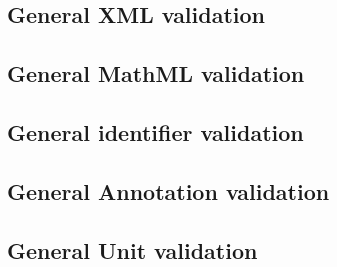 \subsection*{General XML validation} \begin{sbmlenum}


\end{sbmlenum} \subsection*{General MathML validation} \begin{sbmlenum}



\end{sbmlenum} \subsection*{General identifier validation}  \begin{sbmlenum}


\end{sbmlenum} \subsection*{General Annotation validation} \begin{sbmlenum}


\end{sbmlenum} \subsection*{General Unit validation} \begin{sbmlenum}


\end{sbmlenum}
